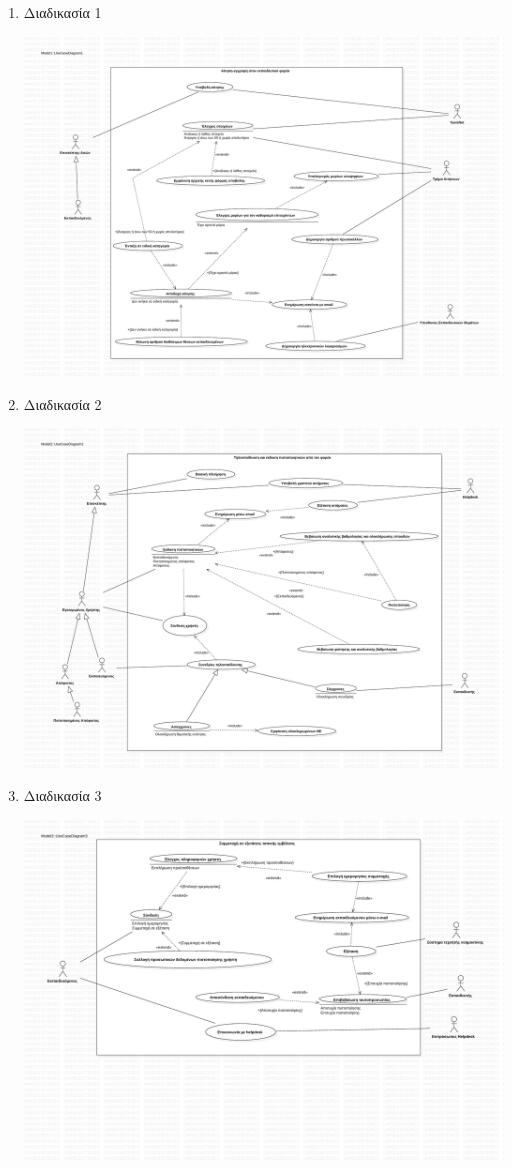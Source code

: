 \documentclass[a4paper, titlepage, twoside]{article}
\begin{document}
\begin{enumerate}
\item Διαδικασία 1
\label{sec:org69bd4fa}
\begin{center}
\includegraphics[width=.9\linewidth]{use-case_1.pdf}
\end{center}
\item Διαδικασία 2
\label{sec:org899c00c}
\begin{center}
\includegraphics[width=.9\linewidth]{use-case_2.pdf}
\end{center}
\item Διαδικασία 3
\label{sec:org34d1430}
\begin{center}
\includegraphics[width=.9\linewidth]{use-case_3.pdf}

\end{center}
\end{enumerate}
\end{document}
